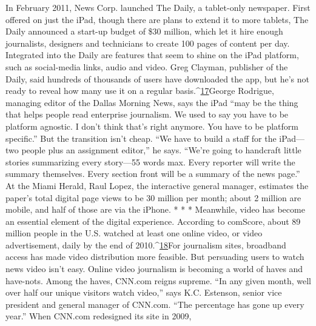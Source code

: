 In February 2011, News Corp. launched The Daily, a tablet-only newspaper.
First offered on just the iPad, though there are plans to extend it to more tablets,
The Daily announced a start-up budget of \$30 million, which let it hire enough
journalists, designers and technicians to create 100 pages of content per day. Integrated
into the Daily are features that seem to shine on the iPad platform, such
as social-media links, audio and video. Greg Clayman, publisher of the Daily, said
hundreds of thousands of users have downloaded the app, but he's not ready to
reveal how many use it on a regular basis.^{\href{#endnotes-chapter-4}{17}}George Rodrigue, managing editor of the Dallas Morning News, says the iPad
``may be the thing that helps people read enterprise journalism. We used to say
you have to be platform agnostic. I don't think that's right anymore. You have
to be platform specific.'' But the transition isn't cheap. ``We have to build a staff
for the iPad—two people plus an assignment editor,'' he says. ``We're going to
handcraft little stories summarizing every story—55 words max. Every reporter
will write the summary themselves. Every section front will be a summary of the
news page.'' At the Miami Herald, Raul Lopez, the interactive general manager,
estimates the paper's total digital page views to be 30 million per month; about 2
million are mobile, and half of those are via the iPhone.
* * *
Meanwhile, video has become an essential element of the digital experience.
According to comScore, about 89 million people in the U.S. watched at least one
online video, or video advertisement, daily by the end of 2010.^{\href{#endnotes-chapter-4}{18}}For journalism sites, broadband access has made video distribution more feasible.
But persuading users to watch news video isn't easy. Online video journalism
is becoming a world of haves and have-nots. Among the haves, CNN.com
reigns supreme.
``In any given month, well over half our unique visitors watch video,'' says
K.C. Estenson, senior vice president and general manager of CNN.com. ``The
percentage has gone up every year.'' When CNN.com redesigned its site in 2009,

